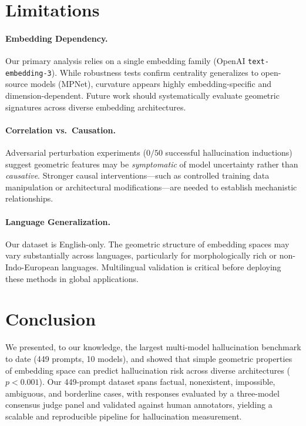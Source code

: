 \documentclass{article}
\begin{document}
\section{Limitations}
\paragraph{Embedding Dependency.}
Our primary analysis relies on a single embedding family (OpenAI \texttt{text-embedding-3}). While robustness tests confirm centrality generalizes to open-source models (MPNet), curvature appears highly embedding-specific and dimension-dependent. Future work should systematically evaluate geometric signatures across diverse embedding architectures.
\paragraph{Correlation vs.~Causation.}
Adversarial perturbation experiments ($0/50$ successful hallucination inductions) suggest geometric features may be \textit{symptomatic} of model uncertainty rather than \textit{causative}. Stronger causal interventions---such as controlled training data manipulation or architectural modifications---are needed to establish mechanistic relationships.
\paragraph{Language Generalization.}
Our dataset is English-only. The geometric structure of embedding spaces may vary substantially across languages, particularly for morphologically rich or non-Indo-European languages. Multilingual validation is critical before deploying these methods in global applications.



\section{Conclusion}

We presented, to our knowledge, the largest multi-model hallucination benchmark to date (449 prompts, 10 models), and showed that simple geometric properties of embedding space can predict hallucination risk across diverse architectures (\(p < 0.001\)). Our 449-prompt dataset spans factual, nonexistent, impossible, ambiguous, and borderline cases, with responses evaluated by a three-model consensus judge panel and validated against human annotators, yielding a scalable and reproducible pipeline for hallucination measurement.
\end{document}
